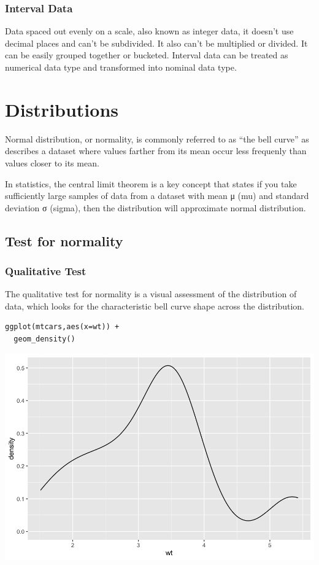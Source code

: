 \documentclass[11pt]{article}
\begin{document}
\subsubsection{Interval Data}
\label{sec:org35c66d5}

Data spaced out evenly on a scale, also known as integer data, it doesn't use decimal places and can't be subdivided. It also can't be multiplied or divided. It can be easily grouped together or bucketed. Interval data can be treated as numerical data type and transformed into nominal data type.

\section{Distributions}
\label{sec:orgcd9e9ea}

Normal distribution, or normality, is commonly referred to as ``the bell curve'' as describes a dataset where values farther from its mean occur less frequenly than values closer to its mean.

In statistics, the central limit theorem is a key concept that states if you take sufficiently large samples of data from a dataset with mean μ (mu) and standard deviation σ (sigma), then the distribution will approximate normal distribution.

\subsection{Test for normality}
\label{sec:orgbdbea43}

\subsubsection{Qualitative Test}
\label{sec:orgb042113}

The qualitative test for normality is a visual assessment of the distribution of data, which looks for the characteristic bell curve shape across the distribution.

\begin{verbatim}
ggplot(mtcars,aes(x=wt)) +
  geom_density()
\end{verbatim}

\begin{org}
\begin{center}
\includegraphics[width=.9\linewidth]{./resources/mtcars_density.png}
\end{center}
\end{org}
\end{document}
